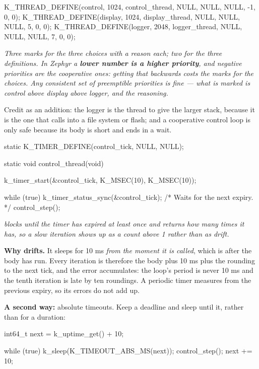 \begin{ccode}
K_THREAD_DEFINE(control, 1024, control_thread, NULL, NULL, NULL, -1, 0, 0);
K_THREAD_DEFINE(display, 1024, display_thread, NULL, NULL, NULL, 5, 0, 0);
K_THREAD_DEFINE(logger, 2048, logger_thread, NULL, NULL, NULL, 7, 0, 0);
\end{ccode}

\noindent{}

\noindent\emph{Three marks for the three choices with a reason each; two for the three definitions.
In Zephyr a \textbf{lower number is a higher priority}, and negative priorities are the cooperative
ones: getting that backwards costs the marks for the choices. Any consistent set of preemptible
priorities is fine --- what is marked is control above display above logger, and the reasoning.}

Credit as an addition: the logger is the thread to give the larger stack, because it is the one that
calls into a file system or flash; and a cooperative control loop is only safe because its body is
short and ends in a wait.


\begin{ccode}
static K_TIMER_DEFINE(control_tick, NULL, NULL);

static void control_thread(void)
{
	k_timer_start(&control_tick, K_MSEC(10), K_MSEC(10));

	while (true) {
		k_timer_status_sync(&control_tick);   /* Waits for the next expiry. */
		control_step();
	}
}
\end{ccode}

\noindent{}

\noindent\emph{ blocks until the timer has expired at least once and
returns how many times it has, so a slow iteration shows up as a count above 1 rather than as
drift.}

\textbf{Why  drifts.} It sleeps for 10 ms \emph{from the moment it is called},
which is after the body has run. Every iteration is therefore the body plus 10 ms plus the rounding
to the next tick, and the error accumulates: the loop's period is never 10 ms and the tenth
iteration is late by ten roundings. A periodic timer measures from the previous expiry, so its
errors do not add up. 

\textbf{A second way:} absolute timeouts. Keep a deadline and sleep until it, rather than for a
duration:

\begin{ccode}
int64_t next = k_uptime_get() + 10;

while (true) {
	k_sleep(K_TIMEOUT_ABS_MS(next));
	control_step();
	next += 10;
}
\end{ccode}

